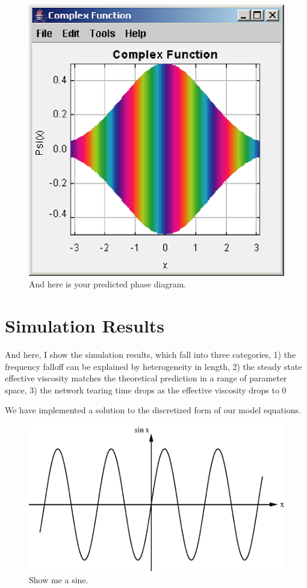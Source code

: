 \documentclass[prb,11pt]{revtex4-1}
\begin{document}
\begin{figure}[h!]
\centering
\includegraphics[scale=0.6]{phase}
\caption{\label{fig:phase}And here is your predicted phase diagram.}
\end{figure}


\section{Simulation Results}

And here, I show the simulation results, which fall into three categories, 1) the frequency falloff can be explained by heterogeneity in length, 2) the steady state effective viscosity matches the theoretical prediction in a range of parameter space, 3) the network tearing time drops as the effective viscosity drops to 0

We have implemented a solution to the discretized form of our model equations.  

\begin{figure}[h!]
\centering
\includegraphics[scale=0.6]{sine}
\caption{\label{fig:sine}Show me a sine.}
\end{figure}
\end{document}
